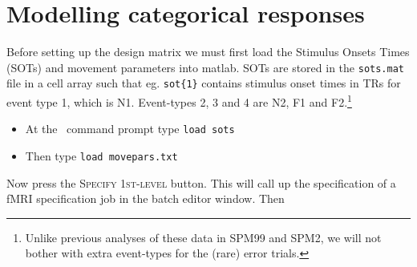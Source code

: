 \section{Modelling categorical responses}

Before setting up the design matrix we must first load the Stimulus Onsets Times (SOTs) and movement parameters into matlab. SOTs are stored in the \texttt{sots.mat} file in a cell array such that eg. \texttt{sot\{1\}} contains stimulus onset times in TRs for event type 1, which is N1. Event-types 2, 3 and 4 are N2, F1 and F2.\footnote{Unlike previous analyses of these data in SPM99 and SPM2, we will not bother with extra event-types for the (rare) error trials.}
\begin{itemize}
\item At the \matlab\ command prompt type \texttt{load sots}
\item Then type \texttt{load movepars.txt}
\end{itemize}

Now press the \textsc{Specify 1st-level} button. This will call up the specification of a fMRI specification job in the batch editor window. Then

